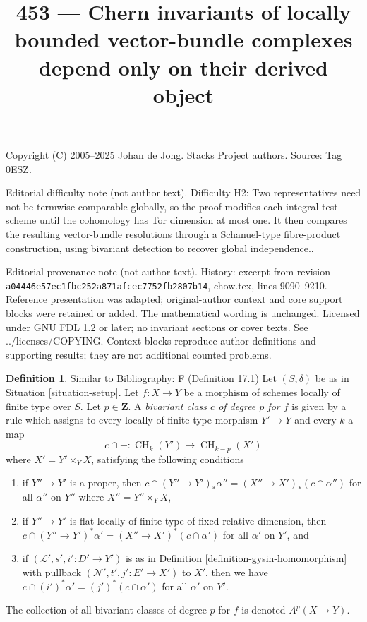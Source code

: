 \documentclass{amsart}
\newenvironment{reference}{\comment}{\endcomment}
\theoremstyle{plain}
\theoremstyle{definition}
\newtheorem{definition}[subsection]{Definition}
\theoremstyle{remark}
\numberwithin{equation}{subsection}
\def\CH{\mathop{\mathrm{CH}}\nolimits}
\begin{document}
\title[Stacks Project, Tag 0ESZ]{453 --- Chern invariants of locally bounded vector-bundle complexes depend only on their derived object}
\maketitle
\noindent Copyright (C) 2005--2025 Johan de Jong. Stacks Project authors. Source: \href{https://stacks.math.columbia.edu/tag/0ESZ}{Tag 0ESZ}.

\noindent Editorial difficulty note (not author text). Difficulty H2: Two representatives need not be termwise comparable globally, so the proof modifies each integral test scheme until the cohomology has Tor dimension at most one. It then compares the resulting vector-bundle resolutions through a Schanuel-type fibre-product construction, using bivariant detection to recover global independence..

\noindent Editorial provenance note (not author text). History: excerpt from revision \texttt{a0444\allowbreak 6e57e\allowbreak c1fbc\allowbreak 252a8\allowbreak 71afc\allowbreak ec775\allowbreak 2fb28\allowbreak 07b14}, chow.tex, lines 9090--9210. Reference presentation was adapted; original-author context and core support blocks were retained or added. The mathematical wording is unchanged. Licensed under GNU FDL 1.2 or later; no invariant sections or cover texts. See ../licenses/COPYING. Context blocks reproduce author definitions and supporting results; they are not additional counted problems.

\begin{definition}
\label{definition-bivariant-class}
\begin{reference}
Similar to \href{https://stacks.math.columbia.edu/bibliography}{Bibliography: F (Definition 17.1)}
\end{reference}
Let $(S, \delta)$ be as in Situation \ref{situation-setup}.
Let $f : X \to Y$ be a morphism of schemes locally of finite type over $S$.
Let $p \in \mathbf{Z}$.
A {\it bivariant class $c$ of degree $p$ for $f$} is given by a rule
which assigns to every locally of finite type morphism $Y' \to Y$
and every $k$ a map
$$
c \cap - : \CH_k(Y') \longrightarrow \CH_{k - p}(X')
$$
where $X' = Y' \times_Y X$, satisfying the following conditions
\begin{enumerate}
\item if $Y'' \to Y'$ is a proper, then
$c \cap (Y'' \to Y')_*\alpha'' = (X'' \to X')_*(c \cap \alpha'')$
for all $\alpha''$ on $Y''$ where $X'' = Y'' \times_Y X$,
\item if $Y'' \to Y'$ is flat locally of finite type of
fixed relative dimension, then
$c \cap (Y'' \to Y')^*\alpha' = (X'' \to X')^*(c \cap \alpha')$
for all $\alpha'$ on $Y'$, and
\item if $(\mathcal{L}', s', i' : D' \to Y')$ is as in
Definition \ref{definition-gysin-homomorphism}
with pullback $(\mathcal{N}', t', j' : E' \to X')$ to $X'$,
then we have $c \cap (i')^*\alpha' = (j')^*(c \cap \alpha')$
for all $\alpha'$ on $Y'$.
\end{enumerate}
The collection of all bivariant classes of degree $p$ for $f$ is
denoted $A^p(X \to Y)$.
\end{definition}
\end{document}

